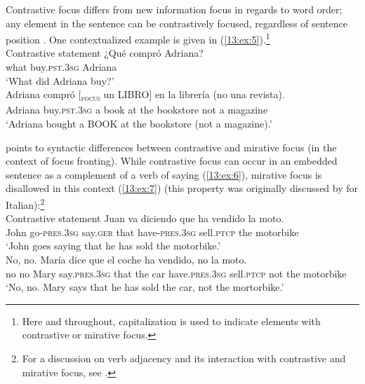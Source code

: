 \documentclass[output=paper,colorlinks,citecolor=brown,draftmode]{langscibook}
\begin{document}
Contrastive focus differs from new information focus in regards to word order; any element in the sentence can be contrastively focused, regardless of sentence position \citep{Zubizarreta1998}. One contextualized example is given in (\ref{13:ex:5}).\footnote{Here and throughout, capitalization is used to indicate elements with contrastive or mirative focus.} \\

\ea Contrastive statement \label{13:ex:5}%
\ea  \label{13:ex:5a}
\gll ¿Qué compró Adriana?\\
what buy.\textsc{pst}.3\textsc{sg} Adriana\\
\glt ‘What did Adriana buy?’\\
\ex  \label{13:ex:5b}
\gll Adriana compró         $[$\textsubscript{\textsc{focus}} un LIBRO$]$ en la  librería      (no una revista).\\
Adriana buy.\textsc{pst}.3\textsc{sg} {} a book at the bookstore    not a magazine\\
\glt ‘Adriana bought a BOOK at the bookstore (not a magazine).’  \\
\z
\z

\citet{Jiménez-Fernández2015b} points to syntactic differences between contrastive and mirative focus (in the context of focus fronting). While contrastive focus can occur in an embedded sentence as a complement of a verb of saying (\ref{13:ex:6}), mirative focus is disallowed in this context (\ref{13:ex:7}) (this property was originally discussed by \citet{Cruschina2012} for Italian):\footnote{For a discussion on verb adjacency and its interaction with contrastive and mirative focus, see  \citet{Jiménez-Fernández2015b}.} \\

\ea Contrastive statement \label{13:ex:6}%
\ea
\gll Juan va diciendo que  ha vendido la moto.\\
John go-\textsc{pres}.3\textsc{sg} say.\textsc{ger}    that have-\textsc{pres}.3\textsc{sg} sell.\textsc{ptcp}      the motorbike\\ 
\glt ‘John goes saying that he has sold the motorbike.’\\
\ex
\gll No, no. María dice              que el coche ha   vendido, no la    moto.\\
no   no  Mary say.\textsc{pres}.3\textsc{sg} that the car    have.\textsc{pres}.3\textsc{sg} sell.\textsc{ptcp}      not the motorbike\\ 
\glt ‘No, no. Mary says that he has sold the car, not the mortorbike.’  \\
\z
\z
\end{document}
